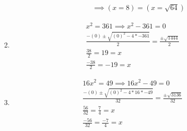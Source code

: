 \documentclass{article}
\begin{document}
\begin{enumerate}
\begin{enumerate}
\begin{align}
			            \implies (x = 8) = (x = \sqrt{64})
		            \end{align}
	      \end{enumerate}
	\item
	      \begin{align}
		      x^2 = 361 \implies x^2 - 361 = 0 \\
		      \frac{ - (0) \pm \sqrt{(0)^2 - 4* - 361}}{2}
		      = \frac{\pm \sqrt{1444}}{2}      \\
		      \frac{38}{2} = 19 = x            \\
		      \frac{ - 38}{2} =  - 19 = x
	      \end{align}
	\item
	      \begin{align}
		      16x^2 = 49 \implies 16x^2 - 49 = 0 \\
		      \frac{ - (0) \pm \sqrt{(0)^2 - 4*16* - 49}}{32}
		      = \frac{\pm \sqrt{3136}}{32}       \\
		      \frac{56}{32} = \frac{7}{4} = x    \\
		      \frac{ - 56}{32} = \frac{ - 7}{4} = x
	      \end{align}
\end{enumerate}
\end{document}
